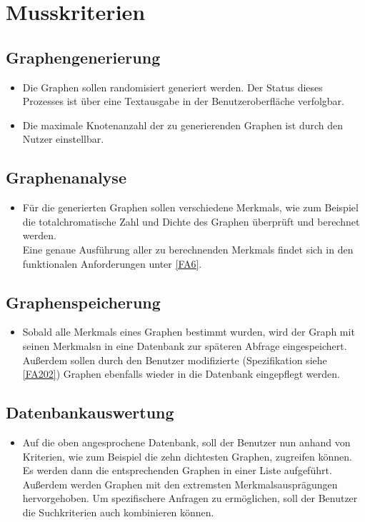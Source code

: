 \documentclass[13pt]{scrreprt}
\begin{document}
\section{Musskriterien}

\subsection{Graphengenerierung}
	\begin{itemize} [label={}]
	\item Die Graphen sollen randomisiert generiert werden. Der Status dieses Prozesses ist über eine Textausgabe in der Benutzeroberfläche verfolgbar.
	\item Die maximale Knotenanzahl der zu generierenden Graphen ist durch den Nutzer einstellbar.
	\end{itemize}
	
\subsection{Graphenanalyse}
	\begin{itemize} [label={}]
	\item Für die generierten Graphen sollen verschiedene \Glspl{Merkmal}, wie zum Beispiel die totalchromatische Zahl und Dichte des Graphen überprüft und berechnet werden. \\ Eine genaue Ausführung aller zu berechnenden \Glspl{Merkmal} findet sich in den funktionalen Anforderungen unter \ref{FA6}. 
	\end{itemize}
	
\subsection{Graphenspeicherung}
	\begin{itemize} [label={}]
	\item Sobald alle \Glspl{Merkmal} eines Graphen bestimmt wurden, wird der Graph mit seinen \Glspl{Merkmal}n in eine Datenbank zur späteren Abfrage eingespeichert. Außerdem sollen durch den Benutzer modifizierte (Spezifikation siehe \ref{FA202}) Graphen ebenfalls wieder in die Datenbank eingepflegt werden. 
	\end{itemize}

\subsection{Datenbankauswertung}
	\begin{itemize} [label={}]
	\item Auf die oben angesprochene Datenbank, soll der Benutzer nun anhand von Kriterien, wie zum Beispiel die zehn dichtesten Graphen, zugreifen können. Es werden dann die entsprechenden Graphen in einer Liste aufgeführt. Außerdem werden Graphen mit den extremsten Merkmalsausprägungen hervorgehoben. Um spezifischere Anfragen zu ermöglichen, soll der Benutzer die Suchkriterien auch kombinieren können.
	\end{itemize}
\end{document}

